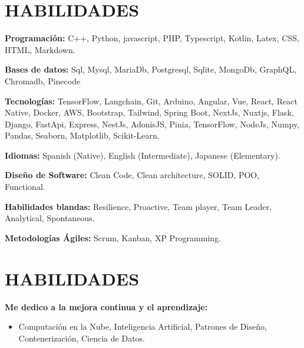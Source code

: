 \documentclass[letterpaper,11pt]{article}
\newcommand{\resumeItem}[1]{
  \item\small{
    {#1 \vspace{-2pt}}
  }
}
\newcommand{\resumeSubHeadingListStart}{\begin{itemize}[leftmargin=0.15in, label={}]}
\newcommand{\resumeSubHeadingListEnd}{\end{itemize}}
\newcommand{\resumeItemListStart}{\begin{itemize}}
\newcommand{\resumeItemListEnd}{\end{itemize}\vspace{-5pt}}
\begin{document}
\section{HABILIDADES}
\vspace{2pt}
\resumeSubHeadingListStart
\small{\item{
              \textbf{Programación:}{ C++, Python, javascript, PHP, Typescript, Kotlin, Latex, CSS, HTML, Markdown.} \\ \vspace{3pt}

              \textbf{Bases de datos:}{ Sql, Mysql, MariaDb, Postgresql, Sqlite, MongoDb, GraphQL, Chromadb, Pinecode} \\ \vspace{3pt}

              \textbf{Tecnologías:}{ TensorFlow, Langchain, Git, Arduino, Angular, Vue, React, React Native, Docker, AWS, Bootstrap, Tailwind, Spring Boot, NextJs, Nuxtjs, Flask, Django, FastApi, Express, NestJs, AdonisJS, Pinia, TensorFlow, NodeJs, Numpy, Pandas, Seaborn, Matplotlib, Scikit-Learn.} \\ \vspace{3pt}

              \textbf{Idiomas:}{ Spanish (Native), English (Intermediate), Japanese (Elementary).}

              \textbf{Diseño de Software:}{ Clean Code, Clean architecture, SOLID, POO, Functional.}

              \textbf{Habilidades blandas:}{ Resilience, Proactive, Team player, Team Leader, Analytical, Spontaneous.}

              \textbf{Metodologías Ágiles:}{ Scrum, Kanban, XP Programming.}

        }}
\resumeSubHeadingListEnd

\section{HABILIDADES}
\vspace{2pt}
\resumeSubHeadingListStart
\small{\item{
              \textbf{Me dedico a la mejora continua y el aprendizaje:}} \\ \vspace{3pt}
}
\resumeItemListStart
\resumeItem{Computación en la Nube, Inteligencia Artificial, Patrones de Diseño, Contenerización, Ciencia de Datos.}
\resumeItemListEnd
\resumeSubHeadingListEnd
\end{document}
